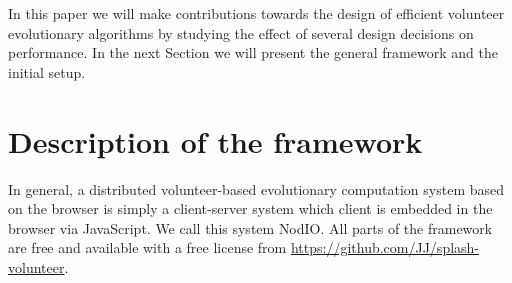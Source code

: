 \documentclass[runningheads,a4paper]{llncs}\usepackage[]{graphicx}\usepackage[]{color}
\begin{document}
In this paper we will make contributions towards the design of
efficient volunteer evolutionary algorithms by studying the effect of
several design decisions on performance. In the next Section we will
present the general framework and the initial setup.


\section{Description of the framework}
\label{sec:description}

In general, a distributed volunteer-based evolutionary computation
system based on the browser is simply a client-server system
which client is embedded in the browser via JavaScript. We call this
system {\sf NodIO}. All parts of the framework are free and available
with a free license from
\url{https://github.com/JJ/splash-volunteer}. 
\end{document}
